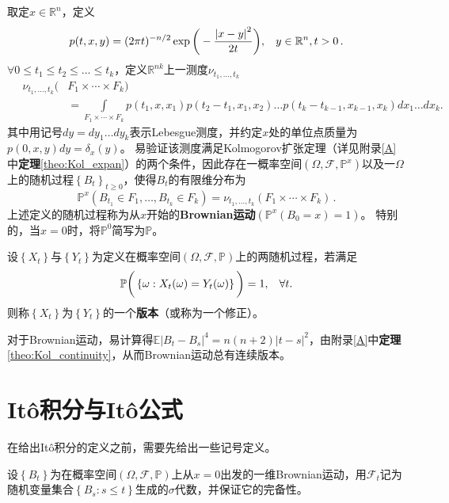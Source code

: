 \documentclass[oneside]{sysuthesis}
\begin{document}
\begin{definition}[Brownian运动]\label{def:Brownian_motion}
	取定$x\in \mathbb{R}^n$，定义
	\[
	p(t,x,y)=(2\pi t)^{-n/2}\exp\bigg(-\frac{\left \vert x-y \right \vert^2}{2t}\bigg),\hspace{0.3cm} y\in \mathbb{R}^n,t>0\,.
	\]
	\noindent $\forall 0\le t_1\le t_2\le\ldots\le t_k$，定义$\mathbb{R}^{nk}$上一测度$\nu_{t_1, \dots, t_k}$
	\begin{align*}
	\quad \nu_{t_1, \dots, t_k} (&F_1 \times \cdots \times F_k) \\
	&= \int\limits_{F_1 \times \cdots \times F_k}p(t_1,x,x_1)p(t_2-t_1,x_1,x_2)\ldots p(t_k-t_{k-1},x_{k-1},x_{k})dx_1\ldots dx_k.
	\end{align*}
	其中用记号$dy=dy_1\ldots dy_k$表示Lebesgue测度，并约定$x$处的单位点质量为$p(0,x,y)dy=\delta _x(y)$。
	易验证该测度满足Kolmogorov扩张定理（详见附录\ref{A}中\textbf{定理}\ref{theo:Kol_expan}）的两个条件，因此存在一概率空间$(\Omega,\mathcal{F},\mathbb{P}^x)$以及一$\Omega$上的随机过程$\left \{ B_t\right \}_{t\ge 0}$，使得$B_t$的有限维分布为
	\[
	\mathbb{P}^x(B_{t_1}\in F_1,\ldots,B_{t_k}\in F_k)=\nu_{t_1, \dots, t_k} (F_1 \times \cdots \times F_k)\,.
	\]
	上述定义的随机过程称为从$x$开始的\textbf{Brownian运动}$(\mathbb{P}^x(B_0=x)=1)$。
	特别的，当$x=0$时，将$\mathbb{P}^0$简写为$\mathbb{P}$。
\end{definition}

\begin{definition}[随机过程的版本]\label{def:modification}
	设$\left \{ X_t\right \}$与$\left \{ Y_t\right \}$为定义在概率空间$(\Omega,\mathcal{F},\mathbb{P})$上的两随机过程，若满足
	\[
	\mathbb{P}\bigg(\left \{ \omega :X_t(\omega)=Y_t(\omega)\right \}\bigg)=1,\hspace{0.3cm}\forall t.
	\]
	则称$\left \{ X_t\right \}$为$\left \{ Y_t\right \}$的一个\textbf{版本}（或称为一个修正）。
\end{definition}

对于Brownian运动，易计算得$\mathbb{E}\left\vert B_t-B_s\right\vert^4=n(n+2)\left\vert t-s\right\vert^2$，由附录\ref{A}中\textbf{定理}\ref{theo:Kol_continuity}，从而Brownian运动总有连续版本。

\section{It\^o积分与It\^o公式}

在给出It\^o积分的定义之前，需要先给出一些记号定义。

\begin{definition}\label{def:Brownian_sigma_flow}
	设$\left\{B_t\right\}$为在概率空间$(\Omega,\mathcal{F},\mathbb{P})$上从$x=0$出发的一维Brownian运动，用$\mathcal{F}_t$记为随机变量集合$\left\{B_s:s\le t\right\}$生成的$\sigma$代数，并保证它的完备性。
\end{definition}
\end{document}
